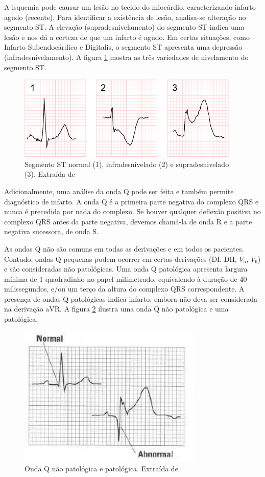 A isquemia pode causar um lesão no tecido do miocárdio, caracterizando infarto agudo (recente). Para identificar a existência de lesão, analisa-se alteração no segmento ST. A elevação (supradesnivelamento) do segmento ST indica uma lesão e nos dá a certeza de que um infarto é agudo. Em certas situações, como Infarto Subendocárdico e Digitalis, o segmento ST apresenta uma depressão (infradesnivelamento). A figura \ref{fig:stdev} mostra as três variedades de nivelamento do segmento ST.

\begin{figure}[ht!]
 \centering
 \includegraphics[width=300pt]{figures/chap2-stseg.png}
 \caption[Segmento ST normal, infradesnivelado e supradesnivelado]{Segmento ST normal (1), infradesnivelado (2) e supradesnivelado (3). Extraída de \cite{nottingham}}
 \label{fig:stdev}
\end{figure}

Adicionalmente, uma análise da onda Q pode ser feita e também permite diagnóstico de infarto. A onda Q é a primeira parte negativa do complexo QRS e nunca é precedida por nada do complexo. Se houver qualquer deflexão positiva no complexo QRS antes da parte negativa, devemos chamá-la de onda R e a parte negativa sucessora, de onda S.

As ondas Q não são comuns em todas as derivações e em todos os pacientes. Contudo, ondas Q pequenas podem ocorrer em certas derivações (DI, DII, $V_5$, $V_6$) e são consideradas não patológicas. Uma onda Q patológica apresenta largura mínima de 1 quadradinho no papel milimetrado, equivalendo à duração de 40 milissegundos, e/ou um terço da altura do complexo QRS correspondente. A presença de ondas Q patológicas indica infarto, embora não deva ser considerada na derivação aVR. A figura \ref{fig:qwave} ilustra uma onda Q não patológica e uma patológica.

\begin{figure}[ht!]
 \centering
 \includegraphics[width=250pt]{figures/chap2-qwave.jpg}
 \caption[Onda Q não patológica e patológica]{Onda Q não patológica e patológica. Extraída de \cite{emsstaff}}
 \label{fig:qwave}
\end{figure}


